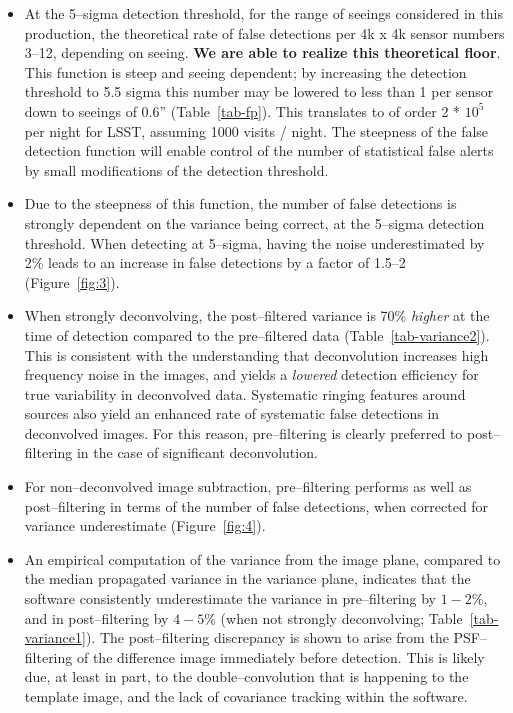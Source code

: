 \documentclass[floatfix, apj]{emulateapj}
\begin{document}
\begin{itemize}


\item At the 5--sigma detection threshold, for the range of seeings considered in this production, the theoretical rate of false detections per 4k x 4k sensor numbers 3--12, depending on seeing.
  {\bf We are able to realize this theoretical floor}.
  This function is steep and seeing dependent; by increasing the detection threshold to 5.5 sigma this number may be lowered to less than 1 per sensor down to seeings of 0.6'' (Table~\ref{tab-fp}).
  This translates to of order 2 * $10^5$ per night for LSST, assuming 1000 visits / night.
  The steepness of the false detection function will enable control of the number of statistical false alerts by small modifications of the detection threshold.

\item Due to the steepness of this function, the number of false detections is strongly dependent on the variance being correct, at the 5--sigma detection threshold.
  When detecting at 5--sigma, having the noise underestimated by 2\% leads to an increase in false detections by a factor of 1.5--2 (Figure~\ref{fig:3}).

\item When strongly deconvolving, the post--filtered variance is 70\% {\it higher} at the time of detection compared to the pre--filtered data (Table~\ref{tab-variance2}).
  This is consistent with the understanding that deconvolution increases high frequency noise in the images, and yields a {\it lowered} detection efficiency for true variability in deconvolved data.
  Systematic ringing features around sources also yield an enhanced rate of systematic false detections in deconvolved images.
  For this reason, pre--filtering is clearly preferred to post--filtering in the case of significant deconvolution.

\item For non--deconvolved image subtraction, pre--filtering performs as well as post--filtering in terms of the number of false detections, when corrected for variance underestimate (Figure~\ref{fig:4}).

\item An empirical computation of the variance from the image plane, compared to the median propagated variance in the variance plane, indicates that the software consistently underestimate the variance in pre--filtering by $1-2\%$, and in post--filtering by $4-5\%$ (when not strongly deconvolving; Table~\ref{tab-variance1}).
  The post--filtering discrepancy is shown to arise from the PSF--filtering of the difference image immediately before detection.
  This is likely due, at least in part, to the double--convolution that is happening to the template image, and the lack of covariance tracking within the software.


\end{itemize}
\end{document}
